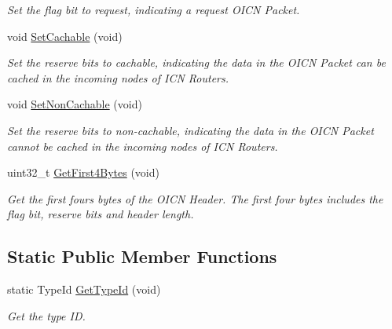 \begin{DoxyCompactItemize}
\begin{DoxyCompactList}\small\item\em Set the flag bit to request, indicating a request O\-I\-C\-N Packet. \end{DoxyCompactList}\item 
void \hyperlink{classns3_1_1OICNHeader_a70e08208e07d59a090093c6f20920556}{Set\-Cachable} (void)
\begin{DoxyCompactList}\small\item\em Set the reserve bits to cachable, indicating the data in the O\-I\-C\-N Packet can be cached in the incoming nodes of I\-C\-N Routers. \end{DoxyCompactList}\item 
void \hyperlink{classns3_1_1OICNHeader_ad1fb10c77ab86b4b9394642cd05738c2}{Set\-Non\-Cachable} (void)
\begin{DoxyCompactList}\small\item\em Set the reserve bits to non-\/cachable, indicating the data in the O\-I\-C\-N Packet cannot be cached in the incoming nodes of I\-C\-N Routers. \end{DoxyCompactList}\item 
uint32\-\_\-t \hyperlink{classns3_1_1OICNHeader_ad9302a3724e7e699eb933a2d2e119da8}{Get\-First4\-Bytes} (void)
\begin{DoxyCompactList}\small\item\em Get the first fours bytes of the O\-I\-C\-N Header. The first four bytes includes the flag bit, reserve bits and header length. \end{DoxyCompactList}\end{DoxyCompactItemize}
\subsection*{Static Public Member Functions}
\begin{DoxyCompactItemize}
\item 
static Type\-Id \hyperlink{classns3_1_1OICNHeader_ab5313a8e4844f7bd21a93557b9b032b1}{Get\-Type\-Id} (void)
\begin{DoxyCompactList}\small\item\em Get the type I\-D. \end{DoxyCompactList}\end{DoxyCompactItemize}
